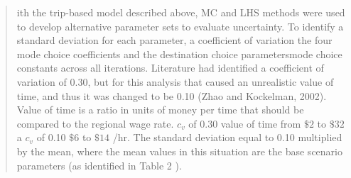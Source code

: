 \documentclass{ar2rc}
\begin{document}
\begin{quote}
    ith the trip-based model described above, MC and LHS methods were used
    to develop alternative parameter sets to evaluate uncertainty. To
    identify a standard deviation for each parameter, \DIFaddbegin {}\DIFaddend a coefficient of
    variation \DIFdelbegin {}\DIFdelend \DIFaddbegin {}\DIFaddend the four mode choice coefficients and the destination
    choice parameters\DIFdelbegin {}\DIFdelend \DIFaddbegin {}\DIFaddend mode choice constants \DIFdelbegin {}\DIFdelend \DIFaddbegin {}\DIFaddend across all iterations.
    Literature had identified a coefficient of variation of 0.30, but for
    this analysis that caused an unrealistic value of time, and thus it was
    changed to be 0.10 (Zhao and Kockelman, 2002). Value of time is a ratio
    in units of money per time that should be compared to the regional wage
    rate. \DIFdelbegin {}\DIFdelend \DIFaddbegin {}\DIFaddend \(c_v\) of 0.30 \DIFdelbegin {}\DIFdelend \DIFaddbegin {}\DIFaddend value of time \DIFdelbegin {}\DIFdelend \DIFaddbegin {}\DIFaddend from \(\$2\)
    to \(\$32\) \DIFdelbegin {}\DIFdelend \DIFaddbegin {}\DIFaddend a \(c_v\) of 0.10 \DIFdelbegin {}\DIFdelend \DIFaddbegin {}\DIFaddend \(\$6\)
    to \(\$14\) /hr\DIFdelbegin {}\DIFdelend \DIFaddbegin {}\DIFaddend .
    The standard deviation \DIFdelbegin {}\DIFdelend \DIFaddbegin {}\DIFaddend equal to 0.10
    multiplied by the mean, where the mean values in this situation are the base
    scenario parameters (as identified in Table 2 ).
    

\end{quote}
\end{document}
